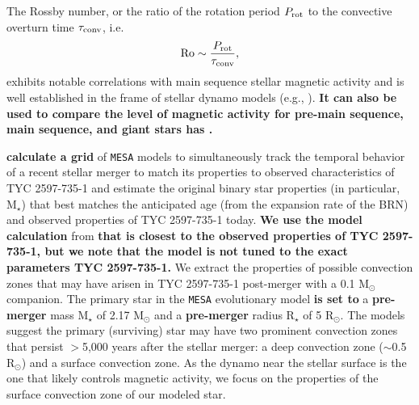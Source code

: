 \documentclass[linenumbers]{aastex631}
\begin{document}
%
The Rossby number, or the ratio of the rotation period $P_{\rm rot}$ to the convective overturn time $\tau_{\rm conv}$, i.e.
\begin{equation}
{\rm Ro} \sim \frac{P_{\rm rot}}{\tau_{\rm conv}}, \label{eqn:ro}
\end{equation}
exhibits notable correlations with main sequence stellar magnetic activity and is well established in the frame of stellar dynamo models (e.g., \citealt{Brandenburg+1998}).
\textbf{It can also be used to compare the level of magnetic activity for pre-main sequence, main sequence, and giant stars has \citep{Preibisch+2005, Pizzolato+2003, Gondoin+2005}.}


\citet{2020Natur.587..387H} \textbf{calculate a grid} of \texttt{MESA} models to simultaneously track the temporal behavior of a recent stellar merger to match its properties to observed characteristics of TYC 2597-735-1 and estimate the original binary star properties (in particular, M$_{\star}$) that best matches the anticipated age (from the expansion rate of the BRN) and observed properties of TYC 2597-735-1 today. \textbf{We use the model calculation} from \citet{2020Natur.587..387H} \textbf{that is closest to the observed properties of TYC 2597-735-1, but we note that the model is not tuned to the exact parameters TYC 2597-735-1.} We extract the properties of possible convection zones that may have arisen in TYC 2597-735-1 post-merger with a 0.1 M$_{\odot}$ companion. The primary star in the \texttt{MESA} evolutionary model \textbf{is set to} a \textbf{pre-merger} mass M$_{\star}$ of 2.17 M$_{\odot}$ and a \textbf{pre-merger} radius R$_{\star}$ of 5 R$_{\odot}$. The models suggest the primary (surviving) star may have two prominent convection zones that persist $>$5,000 years after the stellar merger: a deep convection zone ($\sim$0.5 R$_{\odot}$) and a surface convection zone.
As the dynamo near the stellar surface is the one that likely controls magnetic activity, we focus on the properties of the surface convection zone of our modeled star.
\end{document}
